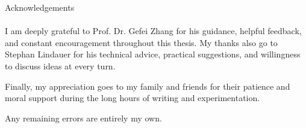 
\thispagestyle{empty}
\vspace*{2.2cm}
\noindent
{\Huge Acknowledgements}\\
\vspace*{1.6cm} \\


I am deeply grateful to Prof. Dr. Gefei Zhang for his guidance, helpful feedback, and constant encouragement throughout this thesis. My thanks also go to Stephan Lindauer for his technical advice, practical suggestions, and willingness to discuss ideas at every turn.

Finally, my appreciation goes to my family and friends for their patience and moral support during the long hours of writing and experimentation.

Any remaining errors are entirely my own.
